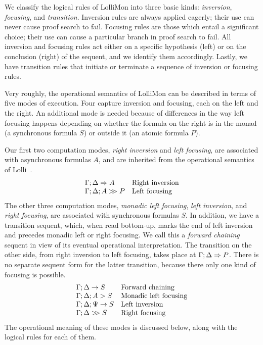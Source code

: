 \documentclass{sig-alt}
\begin{document}
We classify the logical rules of LolliMon into three basic kinds: {\it
inversion}, {\it focusing}, and {\it transition}.  Inversion rules are
always applied eagerly; their use can never cause proof search to fail.
Focusing rules are those which entail a significant choice; their use
can cause a particular branch in proof search to fail.  All inversion
and focusing rules act either on a specific hypothesis (left) or on the
conclusion (right) of the sequent, and we identify them accordingly.
Lastly, we have transition rules that initiate or terminate a sequence
of inversion or focusing rules.

Very roughly, the operational semantics of LolliMon can be described
in terms of five modes of execution.
Four capture inversion and focusing, each on the left and the right.
An additional mode is needed because of differences in the way
left focusing happens depending on whether the formula on the right
is in the monad (a synchronous formula $S$) or outside it (an atomic
formula $P$).

Our first two computation modes, \emph{right inversion} and
\emph{left focusing}, are associated with asynchronous
formulas $A$, and are inherited from the operational semantics of
Lolli~\cite{Hodas94ic}.
$$
\begin{array}{ll}
  \Gamma;\Delta\Rightarrow A & \hbox{Right inversion} \\
  \Gamma;\Delta;A\mathrel{>\!\! >}P & \hbox{Left focusing} \\
\end{array}
$$
%
The other three computation modes, \emph{monadic left focusing},
\emph{left inversion}, and \emph{right focusing}, are
associated with synchronous formulas $S$.  In addition, we
have a transition sequent, which, when read bottom-up,
marks the end of left inversion and precedes
monadic left or right focusing.  We call this a
\emph{forward chaining} sequent in view of its eventual
operational interpretation.  The transition on the other side, from right
inversion to left focusing, takes place at $\Gamma;\Delta\Rightarrow P$.
There is no separate sequent form for the latter transition, because there
only one kind of focusing is possible.
$$
\begin{array}{ll}
  \Gamma;\Delta\rightarrow S & \hbox{Forward chaining} \\
  \Gamma;\Delta;A\mathrel>S & \hbox{Monadic left focusing} \\
  \Gamma;\Delta;\Psi\rightarrow S & \hbox{Left inversion} \\
  \Gamma;\Delta\mathrel{>\!\! >}S & \hbox{Right focusing} \\
\end{array}
$$
The operational meaning of these modes is discussed below, along
with the logical rules for each of them.
\end{document}
